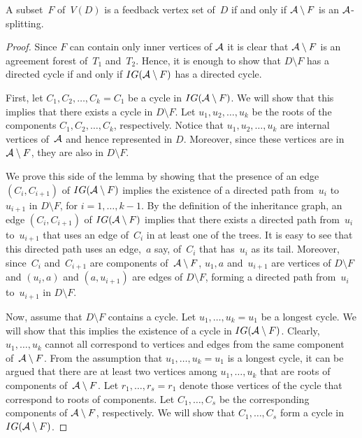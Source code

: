 \begin{lemma}
A subset~$F$ of~$V(D)$ is a feedback vertex set of~$D$ if and only if ${\mathcal A} \setminus F$ is an ${\mathcal A}$-splitting.
\end{lemma}
\begin{proof}
{Since $F$ can contain only inner vertices of ${\mathcal A}$} it is clear that ${\mathcal A} \setminus F$ is an agreement forest of~$T_1$ and~$T_2$. Hence, it is enough to show that $D\setminus F$ has a directed cycle if and only if $IG({\mathcal A} \setminus F)$ has a directed cycle.

First, let $C_1, C_2,\ldots, C_k=C_1$ be a cycle in $IG({\mathcal A} \setminus F)$. We will show that this implies that there exists a cycle in $D\setminus F$. Let $u_1, u_2,\ldots, u_k$ be the roots of the components $C_1, C_2,\ldots ,C_k$, respectively. Notice that $u_1, u_2,\ldots ,u_k$ are internal vertices of~${\mathcal A}$ and hence represented in $D$. Moreover, since these vertices are in ${\mathcal A} \setminus F$, they are also in $D\setminus F$.

We prove this side of the lemma by showing that the presence of an edge $(C_i, C_{i+1})$ of $IG({\mathcal A} \setminus F)$ implies the existence of a directed path from~$u_i$ to~$u_{i+1}$ in $D\setminus F$, for $i=1,\ldots ,k-1$. By the definition of the inheritance graph, an edge $(C_i, C_{i+1})$ of $IG({\mathcal A} \setminus F)$ implies that there exists a directed path from~$u_i$ to~$u_{i+1}$ that uses an edge of~$C_i$ in at least one of the trees. It is easy to see that this directed path uses an edge,~$a$ say, of~$C_i$ that has~$u_i$ as its tail. Moreover, since~$C_i$ and~$C_{i+1}$ are components of~${\mathcal A}\setminus F$, $u_1,a$ and~$u_{i+1}$ are vertices of $D \setminus F$ and $(u_i,a)$ and $(a,u_{i+1})$ are edges of $D\setminus F$, forming a directed path from~$u_i$ to~$u_{i+1}$ in $D\setminus F$.

Now, assume that $D\setminus F$ contains a cycle. Let $u_1,\ldots,u_k=u_1$ be a longest cycle. We will show that this implies the existence of a cycle in $IG({\mathcal A} \setminus F)$. Clearly, $u_1,\ldots ,u_k$ cannot all correspond to vertices and edges from the same component of~${\mathcal A}\setminus F$. From the assumption that $u_1,\ldots,u_k=u_1$ is a longest cycle, it can be argued that there are at least two vertices among $u_1,\ldots ,u_k$ that are roots of components of~${\mathcal A}\setminus F$. Let $r_1,\ldots ,r_s=r_1$ denote those vertices of the cycle that correspond to roots of components. Let $C_1,\ldots ,C_s$ be the corresponding components of ${\mathcal A}\setminus F$, respectively. We will show that $C_1,\ldots ,C_s$ form a cycle in $IG({\mathcal A} \setminus F)$.


\end{proof}
